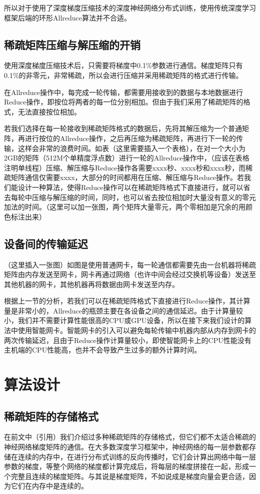   所以对于使用了深度梯度压缩技术的深度神经网络分布式训练，使用传统深度学习框架后端的环形Allreduce算法并不合适。

\subsection{稀疏矩阵压缩与解压缩的开销}
使用深度梯度压缩技术后，只需要将梯度中0.1\%参数进行通信。梯度矩阵只有0.1\%的非零元，非常稀疏，所以会进行压缩并采用稀疏矩阵的格式进行传输。

在Allreduce操作中，每完成一轮传输，都需要用接收到的数据与本地数据进行Reduce操作，即按位将两者的每一位分别相加。但由于我们采用了稀疏矩阵的格式，无法直接按位相加。

若我们选择在每一轮接收到稀疏矩阵格式的数据后，先将其解压缩为一个普通矩阵，再进行按位的Allreduce操作，之后再压缩为稀疏矩阵，再进行下一轮的传输，这样会非常的浪费时间。如表（这里需要插入一个表格），在对一个大小为2GB的矩阵（512M个单精度浮点数）进行一轮的Allreduce操作中，（应该在表格注明单线程）压缩、解压缩与Reduce操作各需要xxxx秒、xxxx秒和xxxx秒，而稀疏矩阵通信仅需要xxxx，大部分的时间都用在压缩、解压缩与Reduce操作。若我们能设计一种算法，使得Reduce操作可以在稀疏矩阵格式下直接进行，就可以省去每轮中压缩与解压缩的时间，同时，也可以省去按位相加时大量没有意义的零元加法的时间。（这里可以加一张图，两个矩阵大量零元，两个零相加是冗余的用颜色标注出来）

\subsection{设备间的传输延迟}
（这里插入一张图）如图是使用普通网卡，每一轮通信都需要先由一台机器将稀疏矩阵由内存发送至网卡，网卡再通过网络（也许中间会经过交换机等设备）发送至其他机器的网卡，其他机器再将数据由网卡发送至内存。

根据上一节的分析，若我们可以在稀疏矩阵格式下直接进行Reduce操作，其计算量是非常小的，Allreduce的瓶颈主要在各设备之间的通信延迟。由于计算量较小，我们并不需要计算性能很高的CPU或GPU设备，所以在接下来我们设计的算法中使用智能网卡。智能网卡的引入可以避免每轮传输中机器内部从内存到网卡的两次传输延迟，且由于Reduce操作计算量较小，即使智能网卡上的CPU性能没有主机端的CPU性能高，也并不会导致产生过多的额外计算时间。

\section{算法设计}
\subsection{稀疏矩阵的存储格式}
在前文中（引用）我们介绍过多种稀疏矩阵的存储格式，但它们都不太适合稀疏的神经网络梯度矩阵的通信。在大多数深度学习框架中，神经网络的每一层参数都存储在连续的内存中，在进行分布式训练的反向传播时，它们会计算出网络中每一层参数的梯度，等整个网络的梯度都计算完成后，将每层的梯度拼接在一起，形成一个完整且连续的梯度矩阵。与其说是梯度矩阵，不如说成是梯度向量会更合适，因为它们在内存中是连续的。

